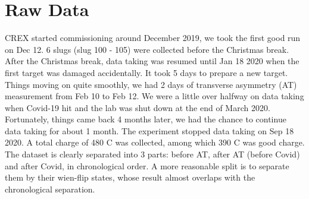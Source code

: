 \begin{comment}
    \begin{itemize}
	\item (design) PREX-II statistical width: $\sim 120\ ppm @30Hz$
	\item (design) BCM resolution: $40\ ppm$
	\item (measured) 1 MHz BCM electronics: $\sim 25\ ppm @30 Hz, 20\ \mu A$
	\item charge and position jitter
	    $$ A_Q: 100-300\ ppm \quad \Delta x: 5-25\ \mu m$$
    \end{itemize}
\end{comment}

\section{Raw Data}
CREX started commissioning around December 2019, we took the first good run on 
Dec 12. 6 slugs (slug 100 - 105) were collected before the Christmas break. After 
the Christmas break, data taking was resumed until Jan 18 2020 when the first \Ca 
target was damaged accidentally. It took 5 days to prepare a new \Ca target.
Things moving on quite smoothly, we had 2 days of transverse asymmetry (AT)
measurement from Feb 10 to Feb 12. We were a little over halfway on data taking 
when Covid-19 hit and the lab was shut down at the end of March 2020. Fortunately,
things came back 4 months later, we had the chance to continue data taking for
about 1 month. The experiment stopped data taking on Sep 18 2020. A total charge
of 480 C was collected, among which 390 C was good charge. The dataset is clearly
separated into 3 parts: before AT, after AT (before Covid) and after Covid, in
chronological order. A more reasonable split is to separate them by their wien-flip
states, whose result almost overlaps with the chronological separation.

